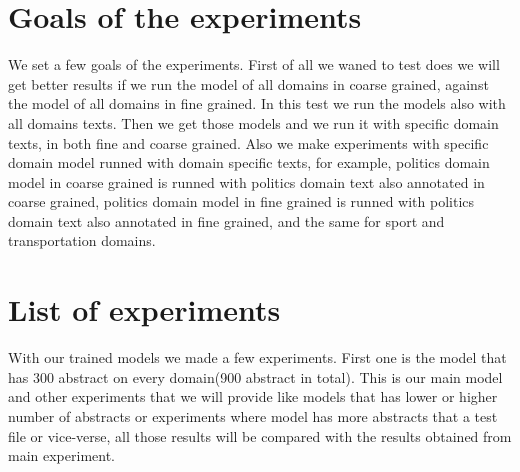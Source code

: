 \documentclass[thesis=M,english]{FITthesis}[2018/05/30]
\begin{document}
\section{Goals of the experiments}
	We set a few goals of the experiments. First of all we waned to test does we will get better results if we run the model of all domains in coarse grained, against the model of all domains in fine grained. In this test we run the models also with all domains texts. Then we get those models and we run it with specific domain texts, in both fine and coarse grained. Also we make experiments with specific domain model runned with domain specific texts, for example, politics domain model in coarse grained is runned with politics domain text also annotated in coarse grained, politics domain model in fine grained is runned with politics domain text also annotated in fine grained, and the same for sport and transportation domains.

\section{List of experiments}
	With our trained models we made a few experiments. First one is the model that has 300 abstract on every domain(900 abstract in total). This is our main model and other experiments that we will provide like models that has lower or higher number of abstracts or experiments where model has more abstracts that a test file or vice-verse, all those results will be compared with the results obtained from main experiment. 
%

%	
\end{document}
